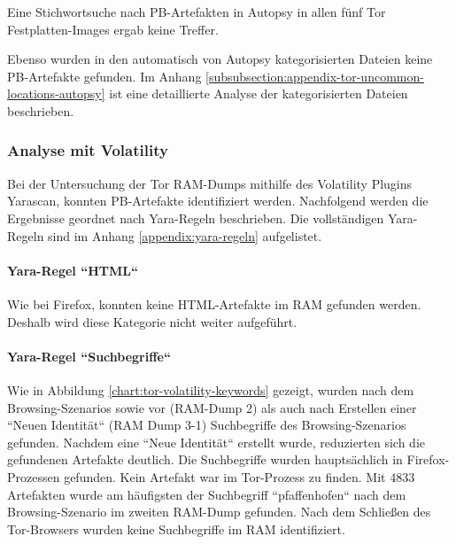 Eine Stichwortsuche nach PB-Artefakten in Autopsy in allen fünf Tor Festplatten-Images ergab keine Treffer.

Ebenso wurden in den automatisch von Autopsy kategorisierten Dateien keine PB-Artefakte gefunden. 
Im Anhang \ref{subsubsection:appendix-tor-uncommon-locations-autopsy} ist eine detaillierte Analyse der kategorisierten Dateien beschrieben.


\subsubsection*{Analyse mit Volatility}
Bei der Untersuchung der Tor RAM-Dumps mithilfe des Volatility Plugins Yarascan, konnten PB-Artefakte identifiziert werden.
Nachfolgend werden die Ergebnisse geordnet nach Yara-Regeln beschrieben. Die vollständigen Yara-Regeln sind im Anhang \ref{appendix:yara-regeln} aufgelistet.

\paragraph*{Yara-Regel ``HTML``}
Wie bei Firefox, konnten keine HTML-Artefakte im RAM gefunden werden. Deshalb wird diese Kategorie nicht weiter aufgeführt.

\paragraph*{Yara-Regel ``Suchbegriffe``}
Wie in Abbildung \ref{chart:tor-volatility-keywords} gezeigt, wurden nach dem Browsing-Szenarios sowie vor (RAM-Dump 2) als auch nach Erstellen einer ``Neuen Identität`` (RAM Dump 3-1) Suchbegriffe des Browsing-Szenarios gefunden.
Nachdem eine ``Neue Identität`` erstellt wurde, reduzierten sich die gefundenen Artefakte deutlich. 
Die Suchbegriffe wurden hauptsächlich in Firefox-Prozessen gefunden. Kein Artefakt war im Tor-Prozess zu finden.
Mit 4833 Artefakten wurde am häufigsten der Suchbegriff ``pfaffenhofen`` nach dem Browsing-Szenario im zweiten RAM-Dump gefunden. 
Nach dem Schließen des Tor-Browsers wurden keine Suchbegriffe im RAM identifiziert.

